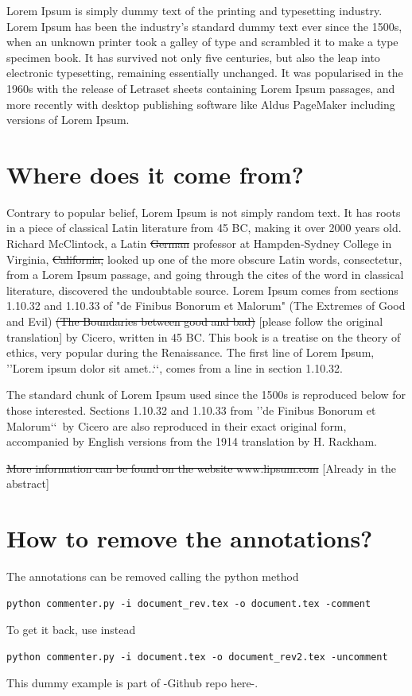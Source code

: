 \documentclass[]{article}
\begin{document}
Lorem Ipsum is simply dummy text of the printing and typesetting industry. Lorem Ipsum has been the industry's standard dummy text ever since the 1500s, when an unknown printer took a galley of type and scrambled it to make a type specimen book. It has survived not only five centuries, but also the leap into electronic typesetting, remaining essentially unchanged. It was popularised in the 1960s with the release of Letraset sheets containing Lorem Ipsum passages, and more recently with desktop publishing software like Aldus PageMaker including versions of Lorem Ipsum.


\section{Where does it come from?}
Contrary to popular belief, Lorem Ipsum is not simply random text. It has roots in a piece of classical Latin literature from 45 BC, making it over 2000 years old. Richard McClintock, a 
\color{ForestGreen}
Latin
\color{Orange}
\st{German}
\color{Black}
professor at Hampden-Sydney College in 
\color{ForestGreen}
Virginia, 
\color{Orange}
\st{California,}
\color{Black}
looked up one of the more obscure Latin words, consectetur, from a Lorem Ipsum passage, and going through the cites of the word in classical literature, discovered the undoubtable source. Lorem Ipsum comes from sections 1.10.32 and 1.10.33 of "de Finibus Bonorum et Malorum" 
\color{ForestGreen}
(The Extremes of Good and Evil) 
\color{Orange}
\st{(The Boundaries between good and bad) }
[please follow the original translation]
\color{Black}
by Cicero, written in 45 BC. This book is a treatise on the theory of ethics, very popular during the Renaissance. The first line of Lorem Ipsum, \rq\rq Lorem ipsum dolor sit amet..\lq\lq, comes from a line in section 1.10.32.

The standard chunk of Lorem Ipsum used since the 1500s is reproduced below for those interested. Sections 1.10.32 and 1.10.33 from \rq\rq de Finibus Bonorum et Malorum\lq\lq~by Cicero are also reproduced in their exact original form, accompanied by English versions from the 1914 translation by H. Rackham.

\noindent
\color{Orange}
\st{More information can be found on the website www.lipsum.com}
[Already in the abstract]
\color{Black}

\section{How to remove the annotations?}
The annotations can be removed  calling the python method 
\begin{verbatim}
python commenter.py -i document_rev.tex -o document.tex -comment
\end{verbatim}
To get it back, use instead
\begin{verbatim}
python commenter.py -i document.tex -o document_rev2.tex -uncomment
\end{verbatim}

\noindent
This dummy example is part of -Github repo here-.
\end{document}
